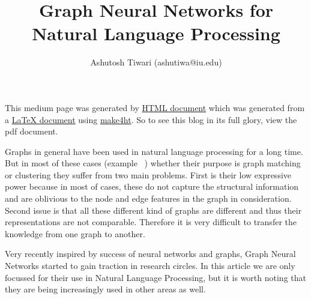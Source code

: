 \documentclass{article}
\title{\textbf{Graph Neural Networks for Natural Language Processing}}
\author{Ashutosh Tiwari (ashutiwa@iu.edu)}
\begin{document}
\maketitle

This medium page was generated by \href{https://thunderock.github.io/blogs/introduction.html}{HTML document} which was generated from a \href{https://thunderock.github.io/blog_pdfs/introduction.pdf}{LaTeX document} using \href{https://github.com/michal-h20/make4ht}{make4ht}. So to see this blog in its full glory, view the pdf document.


Graphs in general have been used in natural language processing for a long time. But in most of these cases (example ~\cite{erkan-2006-language}) whether their purpose is graph matching or clustering they suffer from two main problems. First is their low expressive power because in most of cases, these do not capture the structural information and are oblivious to the node and edge features in the graph in consideration. Second issue is that all these different kind of graphs are different and thus their representations are not comparable. Therefore it is very difficult to transfer the knowledge from one graph to another.


Very recently inspired by success of neural networks and graphs, Graph Neural Networks started to gain traction in research circles. In this article we are only focussed for their use in Natural Language Processing, but it is worth noting that they are being increasingly used in other areas as well. 




\end{document}
